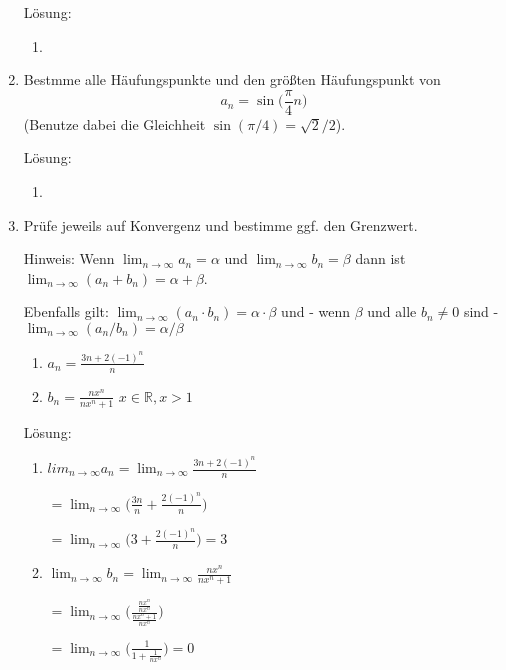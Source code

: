 \documentclass[main.tex]{subfiles}
\begin{document}
\begin{enumerate}
	      Lösung:
	      \begin{enumerate}
		      \item
	      \end{enumerate}
	\item Bestmme alle Häufungspunkte und den größten Häufungspunkt von
	      \[ a_n = \sin \Big( \frac{\pi}{4}n \Big) \]
	      (Benutze dabei die Gleichheit \( \sin( \pi / 4 ) = \sqrt{2} / 2 \)).

	      Lösung:
	      \begin{enumerate}
		      \item
	      \end{enumerate}
	\item Prüfe jeweils auf Konvergenz und bestimme ggf. den Grenzwert.

	      Hinweis: Wenn \( \lim_{n \to \infty} a_n = \alpha \) und
	      \( \lim_{n \to \infty} b_n = \beta \) dann ist
	      \( \lim_{n \to \infty} (a_n + b_n) = \alpha + \beta \).

	      Ebenfalls gilt: \( \lim_{n \to \infty} (a_n \cdot b_n) = \alpha \cdot \beta \) und
	      - wenn \( \beta \)  und alle \( b_n \neq 0 \) sind -
	      \( \lim_{n \to \infty }(a_n / b_n) = \alpha / \beta \)
	      \begin{enumerate}
		      \item \( a_n = \frac{ 3n +2(-1)^n }{ n } \)
		      \item \( b_n = \frac{ nx^n }{ nx^n + 1 } \)
		            \( x \in \mathbb{R}, x > 1 \)
	      \end{enumerate}

	      Lösung:
	      \begin{enumerate}
		      \item \( lim_{n \to \infty} a_n
		            = \lim_{n \to \infty} \frac{3n + 2(-1)^n}{n} \)

		            \( = \lim_{n \to \infty} \Big( \frac{3n}{n} + \frac{2(-1)^n}{n} \Big) \)

		            \( = \lim_{n \to \infty} \Big( 3 + \frac{2(-1)^n}{n} \Big) = 3 \)
		      \item \( \lim_{n \to \infty} b_n
		            = \lim_{n \to \infty} \frac{ nx^n }{ nx^n + 1 } \)

		            \( = \lim_{n \to \infty} \Big( \frac{ \frac{nx^n}{nx^n} }{ \frac{nx^n + 1}{ nx^n} }  \Big) \)

		            \( = \lim_{n \to \infty} \Big( \frac{1}{ 1 + \frac{1}{ nx^n} }  \Big) = 0 \)

	      \end{enumerate}
\end{enumerate}
\end{document}
